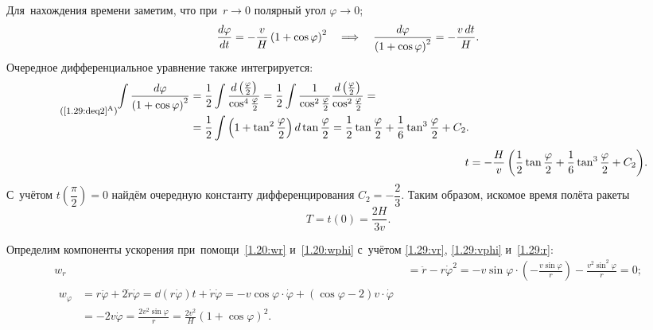 \documentclass{weekly}
\begin{document}
Для~нахождения времени заметим, что при~$r \to 0$
полярный угол $\varphi \to 0$;
\begin{align}
    \frac{d \varphi}{d t} = -\frac{v}{H} \left(1+\cos\varphi\right)^2 \quad \Longrightarrow \quad
    \frac{d\varphi}{\left(1+\cos\varphi\right)^2} = -\frac{v\,dt}{H}.
        \label{1.29:deq2}
\end{align}
Очередное дифференциальное уравнение также интегрируется:
\begin{align}
\tag*{\footnotesize(\ref{1.29:deq2}$^\text{A}$)}
\begin{split}
    \int \frac{d\varphi}{\left(1+\cos\varphi\right)^2}
        &= \frac{1}{2} \int \frac{d\left(\frac{\varphi}{2}\right)}
            {\cos^4 \frac{\varphi}{2}}
        = \frac{1}{2} \int \frac{1}{\cos^2 \frac{\varphi}{2}}
            \frac{d\left(\frac{\varphi}{2}\right)}
            {\cos^2 \frac{\varphi}{2}} = \\
        &= \frac{1}{2} \int \left(1 + \tan^2 \frac{\varphi}{2}\right)
            d\tan\frac{\varphi}{2}
        = \frac{1}{2}\tan\frac{\varphi}{2} +
            \frac{1}{6}\tan^3\frac{\varphi}{2} + C_2.
\end{split} \\[1ex]
    t &= -\frac{H}{v} \left( \frac{1}{2}\tan\frac{\varphi}{2} +
            \frac{1}{6}\tan^3\frac{\varphi}{2} + C_2 \right)\!.
\end{align}
С~учётом $t\!\left(\dfrac{\pi}{2}\right) = 0$ найдём
очередную константу дифференцирования $C_2 = -\dfrac{2}{3}$.
Таким образом, искомое время полёта ракеты
\begin{equation}
    T = t(0) = \frac{2H}{3v}.
\end{equation}

Определим компоненты ускорения при~помощи~\eqref{1.20:wr}
и~\eqref{1.20:wphi} с~учётом \eqref{1.29:vr}, \eqref{1.29:vphi}
и~\eqref{1.29:r}:
\begin{align}
    w_r &= \ddot r - r \dot\varphi^2 = -v \sin\varphi \cdot
            \left(-\frac{v \sin\varphi}{r}\right) -
            \frac{v^2 \sin^2\varphi}{r} = 0; \\
\begin{split}
    w_\varphi &= r \ddot\varphi + 2 \dot r \dot\varphi
        = \dd{(r \dot\varphi)}{t} + \dot r \dot\varphi
        = -v \cos\varphi \cdot \dot\varphi +
            (\cos\varphi - 2) v \cdot \dot\varphi \\
        &= -2v \dot\varphi = \frac{2v^2 \sin\varphi}{r}
        = \frac{2v^2}{H} \left( 1 + \cos\varphi \right)^2.
\end{split}
\end{align}
\end{document}
